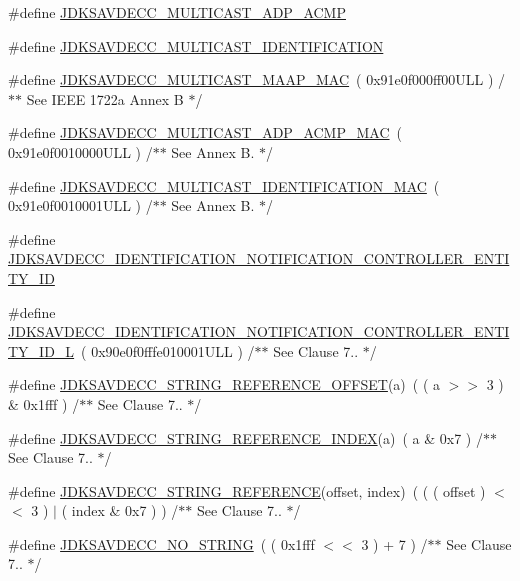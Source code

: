 \begin{DoxyCompactItemize}
\item 
\#define \hyperlink{group__pdu_ga654d40062a44a48e7250fd35fd45639a}{J\+D\+K\+S\+A\+V\+D\+E\+C\+C\+\_\+\+M\+U\+L\+T\+I\+C\+A\+S\+T\+\_\+\+A\+D\+P\+\_\+\+A\+C\+MP}
\item 
\#define \hyperlink{group__pdu_ga8ac98cb658bddc9ffcb82f895a056c6b}{J\+D\+K\+S\+A\+V\+D\+E\+C\+C\+\_\+\+M\+U\+L\+T\+I\+C\+A\+S\+T\+\_\+\+I\+D\+E\+N\+T\+I\+F\+I\+C\+A\+T\+I\+ON}
\item 
\#define \hyperlink{group__pdu_gade8272a7ada679b81d010f4f102b49a7}{J\+D\+K\+S\+A\+V\+D\+E\+C\+C\+\_\+\+M\+U\+L\+T\+I\+C\+A\+S\+T\+\_\+\+M\+A\+A\+P\+\_\+\+M\+AC}~( 0x91e0f000ff00\+U\+L\+L )           /$\ast$$\ast$ See I\+E\+E\+E 1722a Annex B $\ast$/
\item 
\#define \hyperlink{group__pdu_ga5445de40452536f7cf64bd83c081ce0f}{J\+D\+K\+S\+A\+V\+D\+E\+C\+C\+\_\+\+M\+U\+L\+T\+I\+C\+A\+S\+T\+\_\+\+A\+D\+P\+\_\+\+A\+C\+M\+P\+\_\+\+M\+AC}~( 0x91e0f0010000\+U\+L\+L )       /$\ast$$\ast$ See Annex B. $\ast$/
\item 
\#define \hyperlink{group__pdu_gac2ca68780ed2131f86809c9a25b7a0bd}{J\+D\+K\+S\+A\+V\+D\+E\+C\+C\+\_\+\+M\+U\+L\+T\+I\+C\+A\+S\+T\+\_\+\+I\+D\+E\+N\+T\+I\+F\+I\+C\+A\+T\+I\+O\+N\+\_\+\+M\+AC}~( 0x91e0f0010001\+U\+L\+L ) /$\ast$$\ast$ See Annex B. $\ast$/
\item 
\#define \hyperlink{group__pdu_gaa35f49159361c9ab9e607ffed5136f26}{J\+D\+K\+S\+A\+V\+D\+E\+C\+C\+\_\+\+I\+D\+E\+N\+T\+I\+F\+I\+C\+A\+T\+I\+O\+N\+\_\+\+N\+O\+T\+I\+F\+I\+C\+A\+T\+I\+O\+N\+\_\+\+C\+O\+N\+T\+R\+O\+L\+L\+E\+R\+\_\+\+E\+N\+T\+I\+T\+Y\+\_\+\+ID}
\item 
\#define \hyperlink{group__pdu_ga4ff4a501e840465c8ac63b2a03314c23}{J\+D\+K\+S\+A\+V\+D\+E\+C\+C\+\_\+\+I\+D\+E\+N\+T\+I\+F\+I\+C\+A\+T\+I\+O\+N\+\_\+\+N\+O\+T\+I\+F\+I\+C\+A\+T\+I\+O\+N\+\_\+\+C\+O\+N\+T\+R\+O\+L\+L\+E\+R\+\_\+\+E\+N\+T\+I\+T\+Y\+\_\+\+I\+D\+\_\+L}~( 0x90e0f0fffe010001\+U\+L\+L ) /$\ast$$\ast$ See Clause 7.. $\ast$/
\item 
\#define \hyperlink{group__pdu_gac6b03d0cf05700d1318086ad3ae31c11}{J\+D\+K\+S\+A\+V\+D\+E\+C\+C\+\_\+\+S\+T\+R\+I\+N\+G\+\_\+\+R\+E\+F\+E\+R\+E\+N\+C\+E\+\_\+\+O\+F\+F\+S\+ET}(a)~( ( a $>$$>$ 3 ) \& 0x1fff )                        /$\ast$$\ast$ See Clause 7.. $\ast$/
\item 
\#define \hyperlink{group__pdu_ga3120142fc5e539ced8d9746da6ddecfd}{J\+D\+K\+S\+A\+V\+D\+E\+C\+C\+\_\+\+S\+T\+R\+I\+N\+G\+\_\+\+R\+E\+F\+E\+R\+E\+N\+C\+E\+\_\+\+I\+N\+D\+EX}(a)~( a \& 0x7 )                                     /$\ast$$\ast$ See Clause 7.. $\ast$/
\item 
\#define \hyperlink{group__pdu_gaf6340eace608edc826a8d7653e4a7b47}{J\+D\+K\+S\+A\+V\+D\+E\+C\+C\+\_\+\+S\+T\+R\+I\+N\+G\+\_\+\+R\+E\+F\+E\+R\+E\+N\+CE}(offset,  index)~( ( ( offset ) $<$$<$ 3 ) $\vert$ ( index \& 0x7 ) ) /$\ast$$\ast$ See Clause 7.. $\ast$/
\item 
\#define \hyperlink{group__pdu_gaf2a02b18b13454f4c15123de7ca58cf0}{J\+D\+K\+S\+A\+V\+D\+E\+C\+C\+\_\+\+N\+O\+\_\+\+S\+T\+R\+I\+NG}~( ( 0x1fff $<$$<$ 3 ) + 7 )                                           /$\ast$$\ast$ See Clause 7.. $\ast$/
\end{DoxyCompactItemize}
